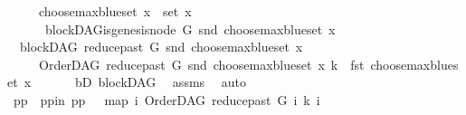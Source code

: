 \begin{isabellebody}
\ \ \ \ \ {\isachardoublequoteopen}choose{\isacharunderscore}{\kern0pt}max{\isacharunderscore}{\kern0pt}blue{\isacharunderscore}{\kern0pt}set\ x\ {\isasymin}\ set\ x{\isachardoublequoteclose}\isanewline
\ \ \ \ \ {\isachardoublequoteopen}{\isasymnot}\ blockDAG{\isachardot}{\kern0pt}is{\isacharunderscore}{\kern0pt}genesis{\isacharunderscore}{\kern0pt}node\ G\ {\isacharparenleft}{\kern0pt}snd\ {\isacharparenleft}{\kern0pt}choose{\isacharunderscore}{\kern0pt}max{\isacharunderscore}{\kern0pt}blue{\isacharunderscore}{\kern0pt}set\ x{\isacharparenright}{\kern0pt}{\isacharparenright}{\kern0pt}\ {\isasymLongrightarrow}\isanewline
\ \ blockDAG\ {\isacharparenleft}{\kern0pt}reduce{\isacharunderscore}{\kern0pt}past\ G\ {\isacharparenleft}{\kern0pt}snd\ {\isacharparenleft}{\kern0pt}choose{\isacharunderscore}{\kern0pt}max{\isacharunderscore}{\kern0pt}blue{\isacharunderscore}{\kern0pt}set\ x{\isacharparenright}{\kern0pt}{\isacharparenright}{\kern0pt}{\isacharparenright}{\kern0pt}{\isachardoublequoteclose}\isanewline
\ \ \ \ \ {\isachardoublequoteopen}OrderDAG\ {\isacharparenleft}{\kern0pt}reduce{\isacharunderscore}{\kern0pt}past\ G\ {\isacharparenleft}{\kern0pt}snd\ {\isacharparenleft}{\kern0pt}choose{\isacharunderscore}{\kern0pt}max{\isacharunderscore}{\kern0pt}blue{\isacharunderscore}{\kern0pt}set\ x{\isacharparenright}{\kern0pt}{\isacharparenright}{\kern0pt}{\isacharparenright}{\kern0pt}\ k\ {\isacharequal}{\kern0pt}\ fst\ {\isacharparenleft}{\kern0pt}choose{\isacharunderscore}{\kern0pt}max{\isacharunderscore}{\kern0pt}blue{\isacharunderscore}{\kern0pt}set\ x{\isacharparenright}{\kern0pt}{\isachardoublequoteclose}\isanewline
%
\isadelimproof
%
\endisadelimproof
%
\isatagproof
{}\isamarkupfalse%
\ {\isacharminus}{\kern0pt}\ \isanewline
\ \ \isamarkupfalse%
\ bD{\isacharcolon}{\kern0pt}\ blockDAG\ \isamarkupfalse%
\ assms{\isacharparenleft}{\kern0pt}{}{\isacharparenright}{\kern0pt}\ \isamarkupfalse%
\ auto\isanewline
\ \ \isamarkupfalse%
\ pp\ \ pp{\isacharunderscore}{\kern0pt}in{\isacharcolon}{\kern0pt}\ {\isachardoublequoteopen}pp\ {\isacharequal}{\kern0pt}\ \ {\isacharparenleft}{\kern0pt}map\ {\isacharparenleft}{\kern0pt}{\isasymlambda}i{\isachardot}{\kern0pt}\ {\isacharparenleft}{\kern0pt}OrderDAG\ {\isacharparenleft}{\kern0pt}reduce{\isacharunderscore}{\kern0pt}past\ G\ i{\isacharparenright}{\kern0pt}\ k{\isacharcomma}{\kern0pt}\ i{\isacharparenright}{\kern0pt}{\isacharparenright}{\kern0pt}\isanewline

\end{isabellebody}
